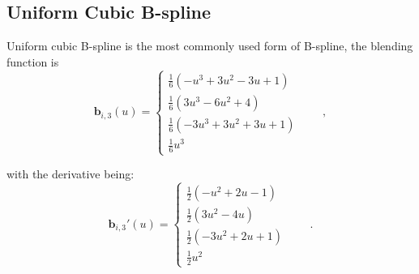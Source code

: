 

\subsection{Uniform Cubic B-spline}
\label{sec:uqb}
Uniform cubic B-spline is the most commonly used form of B-spline, 
the blending function is
\begin{equation}
  \label{eq:4.6}
  \mathbf{b}_{i,3}(u) = \begin{cases} \frac{1}{6}(-u^3+3u^2-3u+1) \\
    \frac{1}{6}(3u^3 -6u^2+4)\\ \frac{1}{6}(-3u^3+3u^2+3u+1) \\
    \frac{1}{6}u^3
   \end{cases}\qquad ,
\end{equation}

with the derivative being: 
\begin{equation}
  \label{eq:4.7}
  \mathbf{b}_{i,3}'(u) = \begin{cases} \frac{1}{2}(-u^2+2u-1) \\
    \frac{1}{2}(3u^2 -4u)\\ \frac{1}{2}(-3u^2+2u+1) \\
    \frac{1}{2}u^2
   \end{cases}\qquad .
\end{equation}


